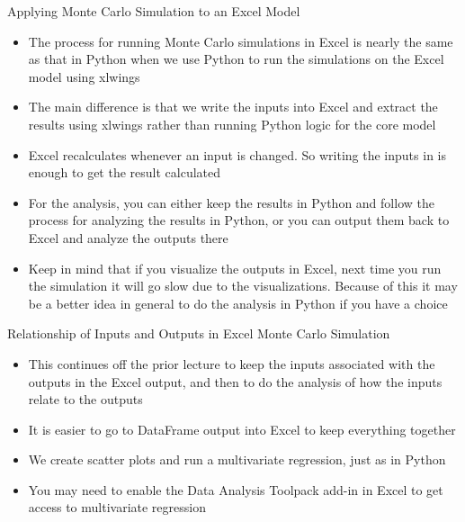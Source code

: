 \documentclass[]{article}
\begin{document}
\begin{section}{Applying Monte Carlo Simulation to an Excel Model}
\begin{itemize}
\item The process for running Monte Carlo simulations in Excel is nearly the same as that in Python when we use Python to run the simulations on the Excel model using xlwings
\item The main difference is that we write the inputs into Excel and extract the results using xlwings rather than running Python logic for the core model
\item Excel recalculates whenever an input is changed. So writing the inputs in is enough to get the result calculated
\item For the analysis, you can either keep the results in Python and follow the process for analyzing the results in Python, or you can output them back to Excel and analyze the outputs there
\item Keep in mind that if you visualize the outputs in Excel, next time you run the simulation it will go slow due to the visualizations. Because of this it may be a better idea in general to do the analysis in Python if you have a choice
\end{itemize}
\end{section}
\begin{section}{Relationship of Inputs and Outputs in Excel Monte Carlo Simulation}
\begin{itemize}
\item This continues off the prior lecture to keep the inputs associated with the outputs in the Excel output, and then to do the analysis of how the inputs relate to the outputs
\item It is easier to go to DataFrame output into Excel to keep everything together
\item We create scatter plots and run a multivariate regression, just as in Python
\item You may need to enable the Data Analysis Toolpack add-in in Excel to get access to multivariate regression
\end{itemize}
\end{section}
\end{document}
